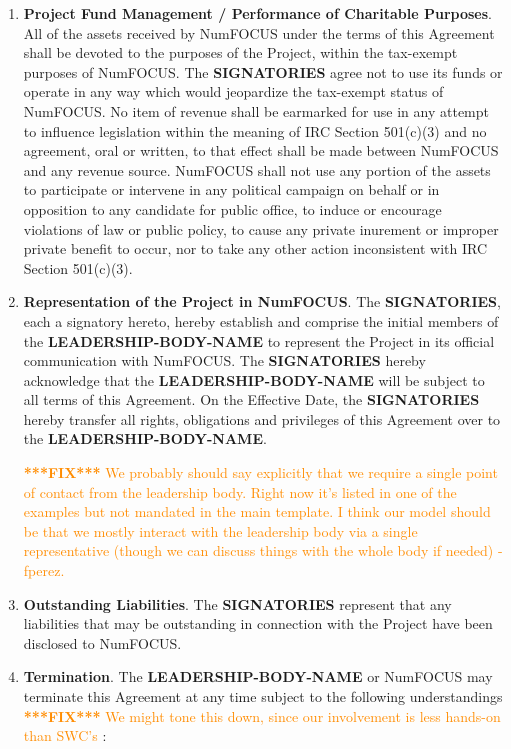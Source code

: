 \documentclass[letterpaper,12pt]{article}
\newcommand{\fix}[1]{
  \textcolor{darkorange} { \textbf{***FIX***} #1 } }
\newcommand{\signatories}{\textbf{SIGNATORIES}}
\newcommand{\leadershipbody}{\textbf{LEADERSHIP-BODY-NAME}}
\begin{document}
\begin{enumerate}[label=\arabic*.,ref=\S~\arabic*]
\item \textbf{Project Fund Management / Performance of Charitable
  Purposes}. \label{CharitablePurpose} All of the assets received by NumFOCUS
  under the terms of this Agreement shall be devoted to the purposes of the
  Project, within the tax-exempt purposes of NumFOCUS. The \signatories{} agree
  not to use its funds or operate in any way which would jeopardize the
  tax-exempt status of NumFOCUS. No item of revenue shall be earmarked for use
  in any attempt to influence legislation within the meaning of IRC Section
  501(c)(3) and no agreement, oral or written, to that effect shall be made
  between NumFOCUS and any revenue source. NumFOCUS shall not use any portion
  of the assets to participate or intervene in any political campaign on behalf
  or in opposition to any candidate for public office, to induce or encourage
  violations of law or public policy, to cause any private inurement or
  improper private benefit to occur, nor to take any other action inconsistent
  with IRC Section 501(c)(3).

\item \textbf{Representation of the Project in
  NumFOCUS}. \label{Representation}The \signatories{}, each a signatory hereto,
  hereby establish and comprise the initial members of the \leadershipbody{} to
  represent the Project in its official communication with NumFOCUS.  The
  \signatories{} hereby acknowledge that the \leadershipbody{} will be subject
  to all terms of this Agreement.  On the Effective Date, the \signatories{}
  hereby transfer all rights, obligations and privileges of this Agreement over
  to the \leadershipbody{}.

\fix{We probably should say explicitly that we require a single point of
  contact from the leadership body. Right now it's listed in one of the
  examples but not mandated in the main template. I think our model should be
  that we mostly interact with the leadership body via a single representative
  (though we can discuss things with the whole body if needed) - fperez.}
  


\item \textbf{Outstanding Liabilities}. The \signatories{} represent that any
  liabilities that may be outstanding in connection with the Project have been
  disclosed to NumFOCUS.

\item \textbf{Termination}. \label{Termination} The \leadershipbody{} or
  NumFOCUS may terminate this Agreement at any time subject to the following
  understandings \fix{We might tone this down, since our involvement is less
    hands-on than SWC's}:


\end{enumerate}
\end{document}
